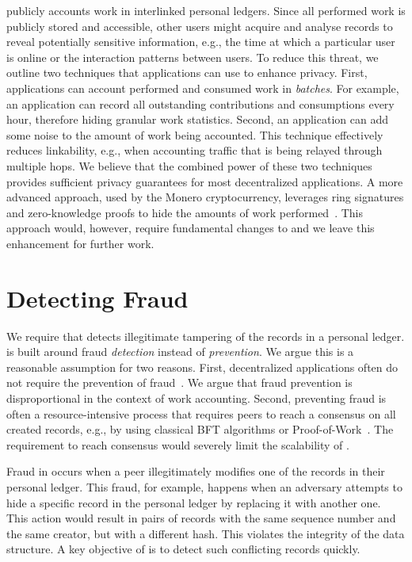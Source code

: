 \TrustChain{} publicly accounts work in interlinked personal ledgers.
Since all performed work is publicly stored and accessible, other users might acquire and analyse \TrustChain{} records to reveal potentially sensitive information, e.g., the time at which a particular user is online or the interaction patterns between users.
To reduce this threat, we outline two techniques that applications can use to enhance privacy.
First, applications can account performed and consumed work in \emph{batches}.
For example, an application can record all outstanding contributions and consumptions every hour, therefore hiding granular work statistics.
Second, an application can add some noise to the amount of work being accounted.
This technique effectively reduces linkability, e.g., when accounting traffic that is being relayed through multiple hops.
We believe that the combined power of these two techniques provides sufficient privacy guarantees for most decentralized applications.
A more advanced approach, used by the Monero cryptocurrency, leverages ring signatures and zero-knowledge proofs to hide the amounts of work performed~\cite{bunz2018bulletproofs,poelstra2018confidential}.
This approach would, however, require fundamental changes to \TrustChain{} and we leave this enhancement for further work.

\section{Detecting Fraud}
\label{sec:detecting_fraud}
We require that \TrustChain{} detects illegitimate tampering of the records in a personal ledger.
\TrustChain{} is built around fraud \emph{detection} instead of \emph{prevention}.
We argue this is a reasonable assumption for two reasons.
First, decentralized applications often do not require the prevention of fraud~\cite{krishnan2002virtual}.
We argue that fraud prevention is disproportional in the context of work accounting.
Second, preventing fraud is often a resource-intensive process that requires peers to reach a consensus on all created records, e.g., by using classical BFT algorithms or Proof-of-Work~\cite{vukolic2015quest}.
The requirement to reach consensus would severely limit the scalability of \TrustChain{}.

Fraud in \TrustChain{} occurs when a peer illegitimately modifies one of the records in their personal ledger.
This fraud, for example, happens when an adversary attempts to hide a specific record in the personal ledger by replacing it with another one.
This action would result in pairs of records with the same sequence number and the same creator, but with a different hash.
This violates the integrity of the \TrustChain{} data structure.
A key objective of \TrustChain{} is to detect such conflicting records quickly.

